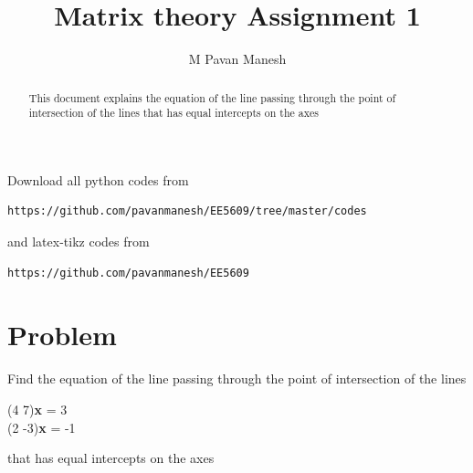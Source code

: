 \documentclass[journal,12pt,twocolumn]{IEEEtran}
\begin{document}
\makeatletter
{}
\makeatother
\let\StandardTheFigure\thefigure
\let\vec\mathbf
\renewcommand{\thefigure}{\theproblem}
\def\putbox#1#2#3{\makebox[0in][l]{\makebox[#1][l]{}\raisebox{\baselineskip}[0in][0in]{\raisebox{#2}[0in][0in]{#3}}}}
     \def\rightbox#1{\makebox[0in][r]{#1}}
     \def\centbox#1{\makebox[0in]{#1}}
     \def\topbox#1{\raisebox{-\baselineskip}[0in][0in]{#1}}
     \def\midbox#1{\raisebox{-0.5\baselineskip}[0in][0in]{#1}}
\vspace{3cm}
\title{Matrix theory Assignment 1}
\author{M Pavan Manesh}
\maketitle
\newpage
\bigskip
\renewcommand{\thefigure}{\theenumi}
\renewcommand{\thetable}{\theenumi}
\begin{abstract}
This document explains the equation of the line passing through
the point of intersection of the lines that has equal intercepts on the axes 
\end{abstract}
Download all python codes from 
%
\begin{lstlisting}
https://github.com/pavanmanesh/EE5609/tree/master/codes
\end{lstlisting}
%
and latex-tikz codes from 
%
\begin{lstlisting}
https://github.com/pavanmanesh/EE5609
\end{lstlisting}
%
\section{Problem}
Find the equation of the line passing through
the point of intersection of the lines
\begin{center}
(4   7)\textbf{x} = 3 \\
(2   -3)\textbf{x} = -1
\end{center}
that has equal intercepts on the axes
%
%
\end{document}
